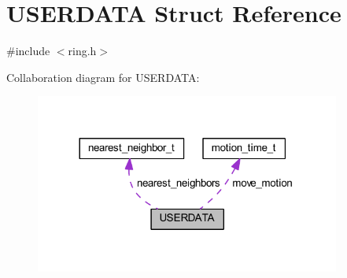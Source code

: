 \hypertarget{struct_u_s_e_r_d_a_t_a}{}\section{U\+S\+E\+R\+D\+A\+TA Struct Reference}
\label{struct_u_s_e_r_d_a_t_a}


{\ttfamily \#include $<$ring.\+h$>$}



Collaboration diagram for U\+S\+E\+R\+D\+A\+TA\+:\nopagebreak
\begin{figure}[H]
\begin{center}
\leavevmode
\includegraphics[width=284pt]{struct_u_s_e_r_d_a_t_a__coll__graph}
\end{center}
\end{figure}
